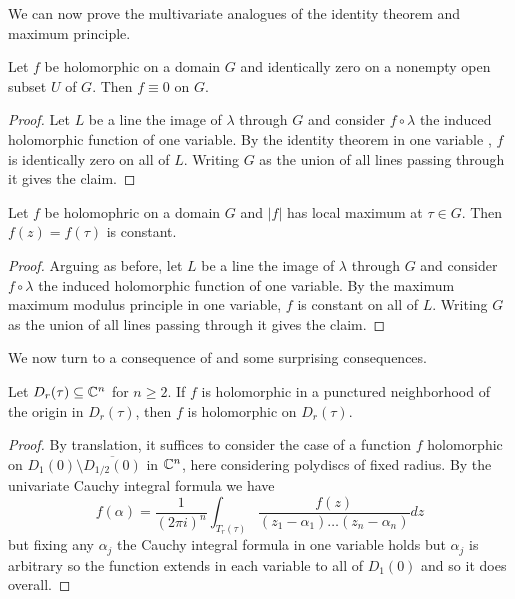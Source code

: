 We can now prove the multivariate analogues of the identity theorem and maximum principle. 
\begin{theorem}\label{thm: multivariate identity}
    Let $f$ be holomorphic on a domain $G$ and identically zero on a nonempty open subset $U$ of $G$. Then $f\equiv0$ on $G$. 
\end{theorem}
\begin{proof}
    Let $L$ be a line the image of $\lambda$ through $G$ and consider $f\circ\lambda$ the induced holomorphic function of one variable. By the identity theorem in one variable , $f$ is identically zero on all of $L$. Writing $G$ as the union of all lines passing through it gives the claim.  
\end{proof}
\begin{theorem}\label{thm: multivariate maximum modulus}
    Let $f$ be holomophric on a domain $G$ and $|f|$ has local maximum at $\tau\in G$. Then $f(z)=f(\tau)$ is constant.
\end{theorem}
\begin{proof}
    Arguing as before, let $L$ be a line the image of $\lambda$ through $G$ and consider $f\circ\lambda$ the induced holomorphic function of one variable. By the maximum maximum modulus principle in one variable, $f$ is constant on all of $L$. Writing $G$ as the union of all lines passing through it gives the claim. 
\end{proof}
We now turn to a consequence of  and some surprising consequences. 
\begin{proposition}\label{prop: holomorphic extensions over polyannuli}
    Let $D_{r}(\tau)\subseteq\mathbb{C}^{n}$ for $n\geq2$. If $f$ is holomorphic in a punctured neighborhood of the origin in $D_{r}(\tau)$, then $f$ is holomorphic on $D_{r}(\tau)$. 
\end{proposition}
\begin{proof}
    By translation, it suffices to consider the case of a function $f$ holomorphic on $D_{1}(0)\setminus\overline{D_{1/2}(0)}$ in $\mathbb{C}^{n}$, here considering polydiscs of fixed radius. By the univariate Cauchy integral formula we have 
    $$f(\alpha)=\frac{1}{(2\pi i)^{n}}\int_{T_{r}(\tau)}\frac{f(z)}{(z_{1}-\alpha_{1})\dots(z_{n}-\alpha_{n})}dz$$
    but fixing any $\alpha_{j}$ the Cauchy integral formula in one variable holds but $\alpha_{j}$ is arbitrary so the function extends in each variable to all of $D_{1}(0)$ and so it does overall. 
\end{proof}
